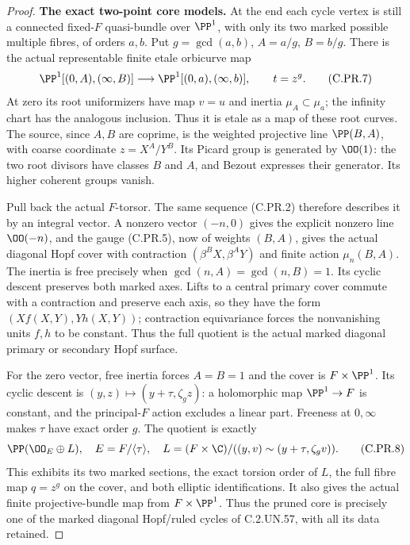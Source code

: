 \begin{proof}
\par\medskip\noindent\textbf{The exact two-point core models.}
At the end each cycle vertex is still a connected fixed-$F$
quasi-bundle over $\PP^1$, with only its two marked possible
multiple fibres, of orders $a,b$. Put $g=\gcd(a,b)$,
$A=a/g$, $B=b/g$. There is the actual representable finite
etale orbicurve map
\[
 \PP^1[(0,A),(\infty,B)]
       \longrightarrow \PP^1[(0,a),(\infty,b)],
                         \qquad t=z^g .                \tag{C.PR.7}
\]
At zero its root uniformizers have map $v=u$ and inertia
$\mu_A\subset\mu_a$; the infinity chart has the analogous
inclusion. Thus it is etale as a map of these root curves.
The source, since $A,B$ are coprime, is the weighted projective
line $\PP(B,A)$, with coarse coordinate
$z=X^A/Y^B$. Its Picard group is generated by $\OO(1)$:
the two root divisors have classes $B$ and $A$, and Bezout
expresses their generator. Its higher coherent groups vanish.

Pull back the actual $F$-torsor. The same sequence (C.PR.2)
therefore describes it by an integral vector. A nonzero vector
$(-n,0)$ gives the explicit nonzero line $\OO(-n)$, and the
gauge (C.PR.5), now of weights $(B,A)$, gives the actual diagonal
Hopf cover with contraction $(\beta^BX,\beta^AY)$ and finite
action $\mu_n(B,A)$. The inertia is free precisely when
$\gcd(n,A)=\gcd(n,B)=1$. Its cyclic descent preserves both
marked axes. Lifts to a central primary cover commute with a
contraction and preserve each axis, so they have the form
$(Xf(X,Y),Yh(X,Y))$; contraction equivariance forces the
nonvanishing units $f,h$ to be constant. Thus the full quotient
is the actual marked diagonal primary or secondary Hopf surface.

For the zero vector, free inertia forces $A=B=1$ and the cover
is $F\times\PP^1$. Its cyclic descent is
$(y,z)\mapsto(y+\tau,\zeta_g z)$: a holomorphic map
$\PP^1\to F$ is constant, and the principal-$F$ action excludes
a linear part. Freeness at $0,\infty$ makes $\tau$ have exact
order $g$. The quotient is exactly
\[
        \PP(\OO_E\oplus L),\quad
        E=F/\langle\tau\rangle,\quad
        L=(F\times\C)/((y,v)\sim(y+\tau,\zeta_gv)).
                                                        \tag{C.PR.8}
\]
This exhibits its two marked sections, the exact torsion order
of $L$, the full fibre map $q=z^g$ on the cover, and both
elliptic identifications. It also gives the actual finite
projective-bundle map from $F\times\PP^1$.
Thus the pruned core is precisely one of the marked diagonal
Hopf/ruled cycles of C.2.UN.57, with all its data retained.


\end{proof}
